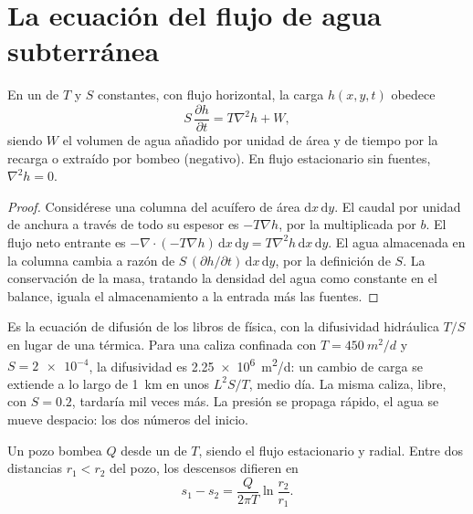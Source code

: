 \section{La ecuación del flujo de agua subterránea}\label{sec:b3:hydrogeology:flow-equation}

\begin{theorem}\label{thm:b3:hydrogeology:flow-equation}
En un  de  $T$ y  $S$ constantes,
con flujo horizontal, la carga $h(x, y, t)$ obedece
\[
S\,\frac{\partial h}{\partial t} = T\nabla^2h + W ,
\]
siendo $W$ el volumen de agua añadido por unidad de área y de tiempo por la recarga o
extraído por bombeo (negativo). En flujo estacionario sin fuentes, $\nabla^2h =
0$.
\end{theorem}

\begin{proof}
Considérese una columna del acuífero de área $\mathrm dx\,\mathrm dy$. El caudal por
unidad de anchura a través de todo su espesor es $-T\nabla h$, por la  multiplicada por $b$. El flujo neto entrante es $-\nabla\cdot(-T\nabla h)\,\mathrm dx\,\mathrm
dy = T\nabla^2h\,\mathrm dx\,\mathrm dy$. El agua almacenada en la columna
cambia a razón de $S\,(\partial h/\partial t)\,\mathrm dx\,\mathrm dy$,
por la definición de $S$. La conservación de la masa, tratando la densidad del agua
como constante en el balance, iguala el almacenamiento a la entrada más las fuentes.
\end{proof}

Es la ecuación de difusión de los libros de física, con la difusividad
hidráulica $T/S$ en lugar de una térmica. Para una caliza confinada con
$T = \qty{450}{m^2/d}$ y $S = \num{2e-4}$, la difusividad es
\qty{2.25e6}{m^2/d}: un cambio de carga se extiende a lo largo de \qty{1}{km} en
unos $L^2S/T$, medio día. La misma caliza, libre, con $S =
0.2$, tardaría mil veces más. La presión se propaga rápido, el
agua se mueve despacio: los dos números del inicio.

\begin{proposition}\label{prop:b3:hydrogeology:thiem}
Un pozo bombea $Q$ desde un  de  $T$, siendo el flujo
estacionario y radial. Entre dos distancias $r_1 < r_2$ del pozo, los
descensos difieren en
\[
s_1 - s_2 = \frac{Q}{2\pi T}\ln\frac{r_2}{r_1} .
\]
\end{proposition}

